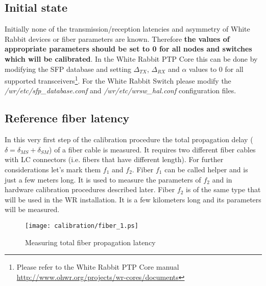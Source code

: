 \subsection{Initial state}
Initially none of the transmission/reception latencies and asymmetry of White 
Rabbit devices or fiber parameters are known. Therefore {\bf the values of 
appropriate parameters should be set to 0 for all nodes and switches which will
be calibrated}. In the White Rabbit PTP Core this can be done by modifying the SFP
database and setting $\Delta_{TX}$, $\Delta_{RX}$ and $\alpha$ values to 0 for all
supported transceivers\footnote{Please refer to the White Rabbit PTP Core manual
\url{http://www.ohwr.org/projects/wr-cores/documents}}. For the White Rabbit Switch 
please modify the \emph{/wr/etc/sfp\_database.conf} and
\emph{/wr/etc/wrsw\_hal.conf} configuration files.

\subsection{Reference fiber latency}
\label{subsec:refiber}

In this very first step of the calibration procedure the total propagation delay
($\delta = \delta_{MS} + \delta_{SM}$) of a fiber cable is measured. It requires
two different fiber cables with LC connectors (i.e. fibers that have
different length). For further considerations let's mark them $f_1$ and $f_2$.
Fiber $f_1$ can be called helper and is just a few meters long. It is used to
measure the parameters of $f_2$ and in hardware calibration procedures described
later. Fiber $f_2$ is of the same type that will be used in the WR installation.
It is a few kilometers long and its parameters will be measured.

\begin{figure}[ht]
	\begin{center}
		\texttt{[image: calibration/fiber\_1.ps]}
		\caption{Measuring total fiber propagation latency}
		\label{fig:refiber:latency}
	\end{center}
\end{figure}

